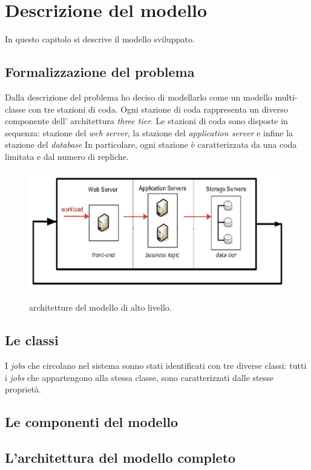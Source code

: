 \documentclass[../main.tex]{subfiles}
\begin{document}
    \chapter{Descrizione del modello}\label{ch:descrizione-del-modello}
    In questo capitolo si descrive il modello sviluppato.


    \section{Formalizzazione del problema}\label{sec:formalizzazione-del-problema}
    Dalla descrizione del problema ho deciso di modellarlo come un modello multi-classe con tre stazioni di coda.
    Ogni stazione di coda rappresenta un diverso componente dell' architettura \textit{three tier}.
    Le stazioni di coda sono disposte in sequenza: stazione del \textit{web server}, la stazione del \textit{application server} e infine la stazione del \textit{database}
    In particolare, ogni stazione è caratterizzata da una coda limitata e dal numero di repliche.

    \centering
    \begin{figure}[H]
        \includegraphics[scale = 0.3]{assets/three_tier}\\
        \caption[\textit{Architettura} del modello]{architetture del modello di alto livello.}
        \label{fig:architettura-del-modello}
    \end{figure}


    \section{Le classi}\label{sec:le-classi}
    I \textit{jobs} che circolano nel sistema sonno stati identificati con tre diverse classi: tutti i \textit{jobs} che appartengono alla stessa classe, sono caratterizzati dalle stesse proprietà.


    \section{Le componenti del modello}\label{sec:le-componenti-del-modello}


    \section{L'architettura del modello completo}\label{sec:l'architettura-del-modello-completo}
\end{document}
